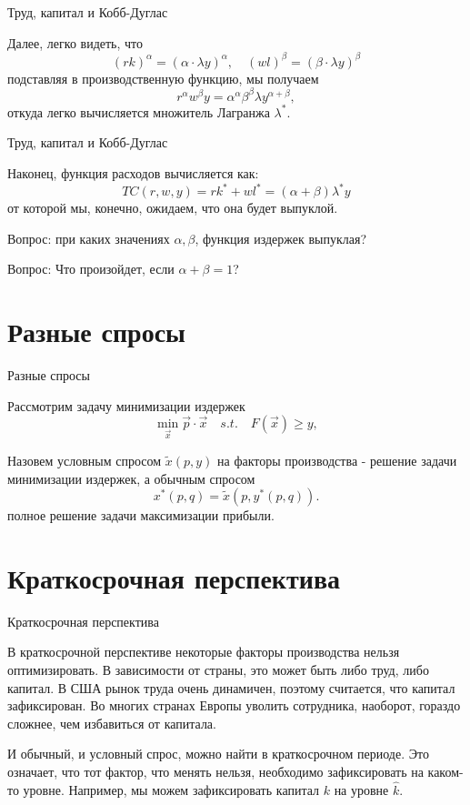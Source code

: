 \documentclass{beamer}
\begin{document}
\begin{frame}{Труд, капитал и Кобб-Дуглас}

Далее, легко видеть, что 
$$(r k)^{\alpha} = (\alpha \cdot \lambda y)^{\alpha}, \quad (w l)^{\beta} = (\beta \cdot \lambda y)^{\beta}$$
подставляя в производственную функцию, мы получаем
$$ r^{\alpha}w^{\beta} y = \alpha^{\alpha} \beta^{\beta} \lambda y^{\alpha + \beta},$$
откуда легко вычисляется множитель Лагранжа $\lambda^{\ast}$.

\end{frame}

\begin{frame}{Труд, капитал и Кобб-Дуглас}

Наконец, функция расходов вычисляется как:
$$ TC(r,w,y) = r k^{\ast} + w l^{\ast} = (\alpha + \beta) \lambda^{\ast} y$$
от которой мы, конечно, ожидаем, что она будет выпуклой.

Вопрос: при каких значениях $\alpha, \beta$, функция издержек выпуклая? 

Вопрос: Что произойдет, если $\alpha + \beta = 1$?

\end{frame}

\section{Разные спросы}

\begin{frame}{Разные спросы}

Рассмотрим задачу минимизации издержек
$$ \min_{\vec x} \vec p \cdot \vec x \quad s.t. \quad F(\vec x) \geqslant y,$$

\begin{definition}
Назовем условным спросом $\tilde x(p, y)$ на факторы производства - решение задачи минимизации издержек, а обычным спросом
$$x^{\ast}(p, q) = \tilde x(p, y^{\ast}(p, q)).$$
полное решение задачи максимизации прибыли.
\end{definition}

\end{frame}

\section{Краткосрочная перспектива}

\begin{frame}{Краткосрочная перспектива}

В краткосрочной перспективе некоторые факторы производства нельзя оптимизировать. В зависимости от страны, это может быть либо труд, либо капитал. В США рынок труда очень динамичен, поэтому считается, что капитал зафиксирован. Во многих странах Европы уволить сотрудника, наоборот, гораздо сложнее, чем избавиться от капитала. 

И обычный, и условный спрос, можно найти в краткосрочном периоде. Это означает, что тот фактор, что менять нельзя, необходимо зафиксировать на каком-то уровне. Например, мы можем зафиксировать капитал $k$ на уровне $\hat k$.

\end{frame}
\end{document}
